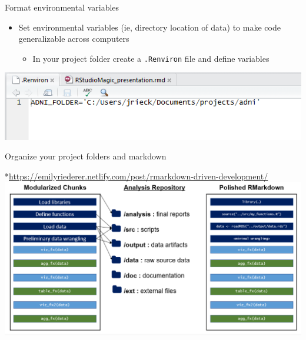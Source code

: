 \documentclass[ignorenonframetext,]{beamer}
\providecommand{\tightlist}{%
  \setlength{\itemsep}{0pt}\setlength{\parskip}{0pt}}
\begin{document}
\begin{frame}[fragile]{Format environmental variables}
\protect\hypertarget{format-environmental-variables}{}

\begin{itemize}
\tightlist
\item
  Set environmental variables (ie, directory location of data) to make
  code generalizable across computers

  \begin{itemize}
  \tightlist
  \item
    In your project folder create a \texttt{.Renviron} file and define
    variables
  \end{itemize}
\end{itemize}

\includegraphics{../external/images/setup_3_rstudio_project_environ.PNG}

\end{frame}

\begin{frame}{Organize your project folders and markdown}
\protect\hypertarget{organize-your-project-folders-and-markdown}{}

*\url{https://emilyriederer.netlify.com/post/rmarkdown-driven-development/}
\includegraphics{../external/images/setup_4_markdown_project.PNG}

\end{frame}
\end{document}
